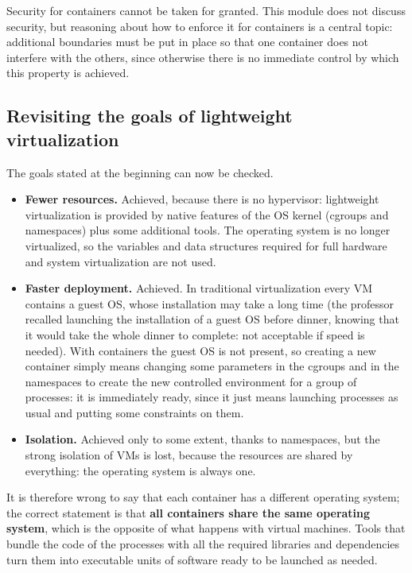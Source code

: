 Security for containers cannot be taken for granted. This module does not discuss security, but reasoning about how to enforce it for containers is a central topic: additional boundaries must be put in place so that one container does not interfere with the others, since otherwise there is no immediate control by which this property is achieved.

\subsection{Revisiting the goals of lightweight virtualization}

The goals stated at the beginning can now be checked.

\begin{itemize}
\item \textbf{Fewer resources.} Achieved, because there is no hypervisor: lightweight virtualization is provided by native features of the OS kernel (cgroups and namespaces) plus some additional tools. The operating system is no longer virtualized, so the variables and data structures required for full hardware and system virtualization are not used.
\item \textbf{Faster deployment.} Achieved. In traditional virtualization every VM contains a guest OS, whose installation may take a long time (the professor recalled launching the installation of a guest OS before dinner, knowing that it would take the whole dinner to complete: not acceptable if speed is needed). With containers the guest OS is not present, so creating a new container simply means changing some parameters in the cgroups and in the namespaces to create the new controlled environment for a group of processes: it is immediately ready, since it just means launching processes as usual and putting some constraints on them.
\item \textbf{Isolation.} Achieved only to some extent, thanks to namespaces, but the strong isolation of VMs is lost, because the resources are shared by everything: the operating system is always one.
\end{itemize}

It is therefore wrong to say that each container has a different operating system; the correct statement is that \textbf{all containers share the same operating system}, which is the opposite of what happens with virtual machines. Tools that bundle the code of the processes with all the required libraries and dependencies turn them into executable units of software ready to be launched as needed.

